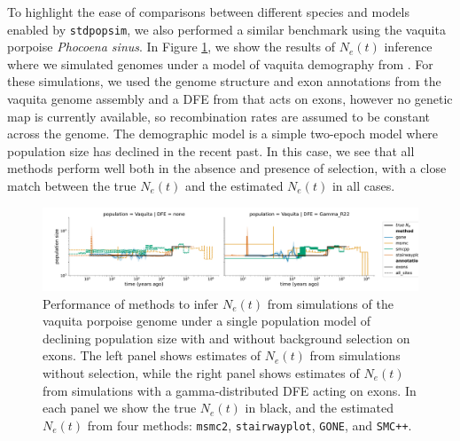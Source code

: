 \documentclass[hidelinks]{article}
\newcommand{\stdpopsim}{\texttt{stdpopsim}\xspace}
\newcommand{\msmc}{\texttt{msmc2}\xspace}
\newcommand{\stairway}{\texttt{stairwayplot}\xspace}
\newcommand{\gone}{\texttt{GONE}\xspace}
\newcommand{\smcpp}{\texttt{SMC++}\xspace}
\begin{document}
    To highlight the ease of comparisons between different species and models enabled by \stdpopsim,
    we also performed a similar benchmark using the vaquita porpoise \textit{Phocoena sinus}.
    In Figure \ref{fig:1pop-vaquita-demography}, we show the results of $N_e(t)$ inference
    where we simulated genomes under a model of vaquita demography from \textcite{robinson2022critically}.
    For these simulations, we used the genome structure and exon annotations from the vaquita genome assembly
    and a DFE from \textcite{robinson2022critically} that acts on exons, however no genetic map 
    is currently available, so recombination rates are assumed to be constant across the genome.
    The demographic model is a simple two-epoch model where population size has declined in the recent past. 
    In this case, we see that all methods perform well both in the absence and presence of selection,
    with a close match between the true $N_e(t)$ and the estimated $N_e(t)$ in all cases.


\begin{figure}[t]
    \centering
    \includegraphics[width=\textwidth]{figures/PhoSin/Vaquita2Epoch_1R22/estimated_Ne_t_final}
    \caption{
    \label{fig:1pop-vaquita-demography}
    Performance of methods to infer $N_e(t)$ from simulations of the vaquita porpoise genome under a single population
    model of declining population size \citep{robinson2022critically} with and without background selection on exons. 
    The left panel shows estimates of $N_e(t)$ from simulations
    without selection, while the right panel shows estimates of $N_e(t)$ from simulations with a gamma-distributed   
    DFE acting on exons. In each panel we show the true $N_e(t)$ in black, and the estimated $N_e(t)$ from four methods:    
    \msmc \citep{Schiffels2020}, \stairway \citep{liu2020stairway}, \gone \citep{santiago2020recent}, and \smcpp \citep{terhorst2017robust}.  
    }
\end{figure}
\end{document}
